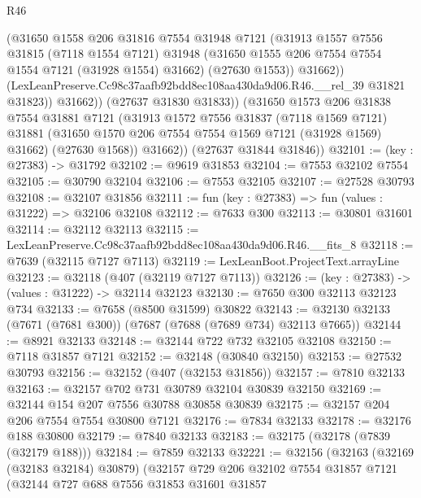 \begin{lexlean}{R46}
\begin{coremodule}
                  (@31650
                    @1558
                    @206
                    @31816
                    @7554
                    @31948
                    @7121
                    (@31913
                      @1557
                      @7556
                      @31815
                      (@7118 @1554 @7121)
                      @31948
                      (@31650 @1555 @206 @7554 @7554 @1554 @7121 (@31928 @1554) @31662)
                      (@27630 @1553))
                    @31662))
                (LexLeanPreserve.Cc98c37aafb92bdd8ec108aa430da9d06.R46.__rel_39 @31821 @31823))
              @31662))
          (@27637 @31830 @31833))
        (@31650
          @1573
          @206
          @31838
          @7554
          @31881
          @7121
          (@31913
            @1572
            @7556
            @31837
            (@7118 @1569 @7121)
            @31881
            (@31650 @1570 @206 @7554 @7554 @1569 @7121 (@31928 @1569) @31662)
            (@27630 @1568))
          @31662))
      (@27637 @31844 @31846))
@32101 := (key : @27383) -> @31792
@32102 := @9619 @31853
@32104 := @7553 @32102 @7554
@32105 := @30790 @32104
@32106 := @7553 @32105
@32107 := @27528 @30793
@32108 := @32107 @31856
@32111 := fun (key : @27383) => fun (values : @31222) => @32106 @32108
@32112 := @7633 @300
@32113 := @30801 @31601
@32114 := @32112 @32113
@32115 := LexLeanPreserve.Cc98c37aafb92bdd8ec108aa430da9d06.R46.__fits_8
@32118 := @7639 (@32115 @7127 @7113)
@32119 := LexLeanBoot.ProjectText.arrayLine
@32123 := @32118 (@407 (@32119 @7127 @7113))
@32126 := (key : @27383) -> (values : @31222) -> @32114 @32123
@32130 := @7650 @300 @32113 @32123 @734
@32133 := @7658 (@8500 @31599) @30822
@32143 := @32130 @32133 (@7671 (@7681 @300)) (@7687 (@7688 (@7689 @734) @32113 @7665))
@32144 := @8921 @32133
@32148 := @32144 @722 @732 @32105 @32108
@32150 := @7118 @31857 @7121
@32152 := @32148 (@30840 @32150)
@32153 := @27532 @30793
@32156 := @32152 (@407 (@32153 @31856))
@32157 := @7810 @32133
@32163 := @32157 @702 @731 @30789 @32104 @30839 @32150
@32169 := @32144 @154 @207 @7556 @30788 @30858 @30839
@32175 := @32157 @204 @206 @7554 @7554 @30800 @7121
@32176 := @7834 @32133
@32178 := @32176 @188 @30800
@32179 := @7840 @32133
@32183 := @32175 (@32178 (@7839 (@32179 @188)))
@32184 := @7859 @32133
@32221 := @32156
    (@32163
      (@32169 (@32183 @32184) @30879)
      (@32157
        @729
        @206
        @32102
        @7554
        @31857
        @7121
        (@32144
          @727
          @688
          @7556
          @31853
          @31601
          @31857

\end{coremodule}
\end{lexlean}
